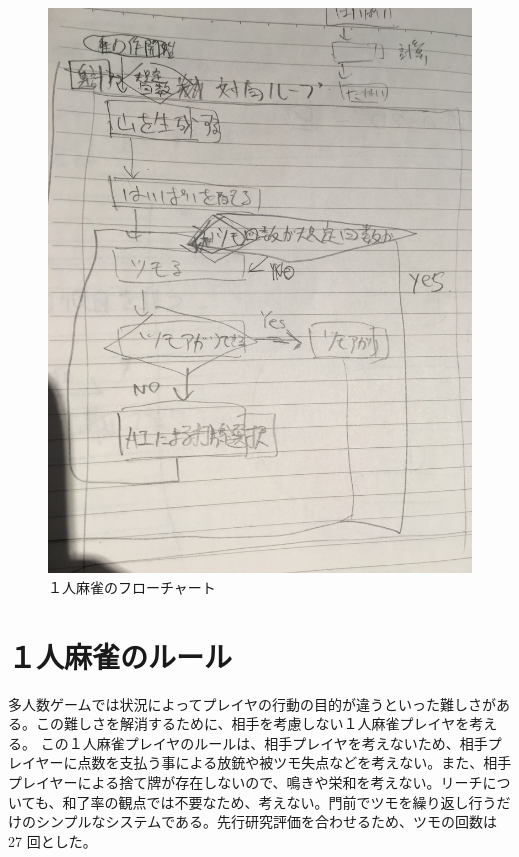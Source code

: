 \begin{figure}[h]
 \centering
 \includegraphics[keepaspectratio, scale=0.1,bb=0 0 3024 4032]
      {img/flow.jpg}
 \caption{１人麻雀のフローチャート}
 \label{flow1}
\end{figure}

\section{１人麻雀のルール}
多人数ゲームでは状況によってプレイヤの行動の目的が違うといった難しさがある。この難しさを解消するために、相手を考慮しない１人麻雀プレイヤを考える。
この１人麻雀プレイヤのルールは、相手プレイヤを考えないため、相手プレイヤーに点数を支払う事による放銃や被ツモ失点などを考えない。また、相手プレイヤーによる捨て牌が存在しないので、鳴きや栄和を考えない。リーチについても、和了率の観点では不要なため、考えない。門前でツモを繰り返し行うだけのシンプルなシステムである。先行研究\cite{bakuuti}評価を合わせるため、ツモの回数は 27 回とした。

